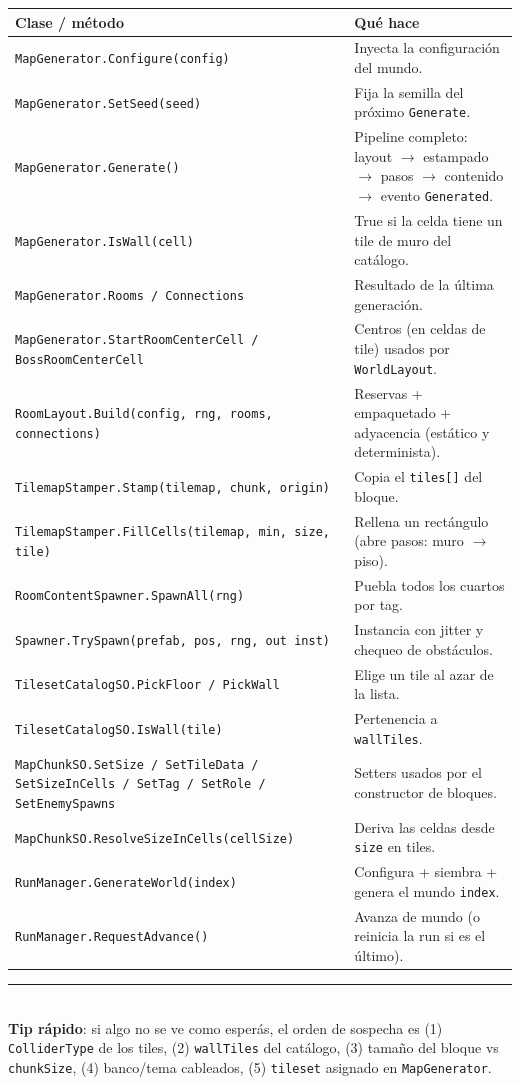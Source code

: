 \documentclass[11pt,a4paper]{article}
\newcommand{\code}[1]{\texttt{#1}}
\begin{document}
\begin{longtable}{@{}p{5.4cm}p{10.6cm}@{}}
\toprule
\textbf{Clase / método} & \textbf{Qué hace} \\
\midrule
\endhead
\code{MapGenerator.Configure(config)} & Inyecta la configuración del mundo. \\
\code{MapGenerator.SetSeed(seed)} & Fija la semilla del próximo \code{Generate}. \\
\code{MapGenerator.Generate()} & Pipeline completo: layout $\rightarrow$ estampado $\rightarrow$ pasos $\rightarrow$ contenido $\rightarrow$ evento \code{Generated}. \\
\code{MapGenerator.IsWall(cell)} & True si la celda tiene un tile de muro del catálogo. \\
\code{MapGenerator.Rooms / Connections} & Resultado de la última generación. \\
\code{MapGenerator.StartRoomCenterCell / BossRoomCenterCell} & Centros (en celdas de tile) usados por \code{WorldLayout}. \\
\code{RoomLayout.Build(config, rng, rooms, connections)} & Reservas + empaquetado + adyacencia (estático y determinista). \\
\code{TilemapStamper.Stamp(tilemap, chunk, origin)} & Copia el \code{tiles[]} del bloque. \\
\code{TilemapStamper.FillCells(tilemap, min, size, tile)} & Rellena un rectángulo (abre pasos: muro $\rightarrow$ piso). \\
\code{RoomContentSpawner.SpawnAll(rng)} & Puebla todos los cuartos por tag. \\
\code{Spawner.TrySpawn(prefab, pos, rng, out inst)} & Instancia con jitter y chequeo de obstáculos. \\
\code{TilesetCatalogSO.PickFloor / PickWall} & Elige un tile al azar de la lista. \\
\code{TilesetCatalogSO.IsWall(tile)} & Pertenencia a \code{wallTiles}. \\
\code{MapChunkSO.SetSize / SetTileData / SetSizeInCells / SetTag / SetRole / SetEnemySpawns} & Setters usados por el constructor de bloques. \\
\code{MapChunkSO.ResolveSizeInCells(cellSize)} & Deriva las celdas desde \code{size} en tiles. \\
\code{RunManager.GenerateWorld(index)} & Configura + siembra + genera el mundo \code{index}. \\
\code{RunManager.RequestAdvance()} & Avanza de mundo (o reinicia la run si es el último). \\
\bottomrule
\end{longtable}

\vfill
\noindent\rule{\textwidth}{0.4pt}\\
\textbf{Tip rápido}: si algo no se ve como esperás, el orden de sospecha es
(1) \code{ColliderType} de los tiles, (2) \code{wallTiles} del catálogo,
(3) tamaño del bloque vs \code{chunkSize}, (4) banco/tema cableados, (5) \code{tileset} asignado en \code{MapGenerator}.
\end{document}
